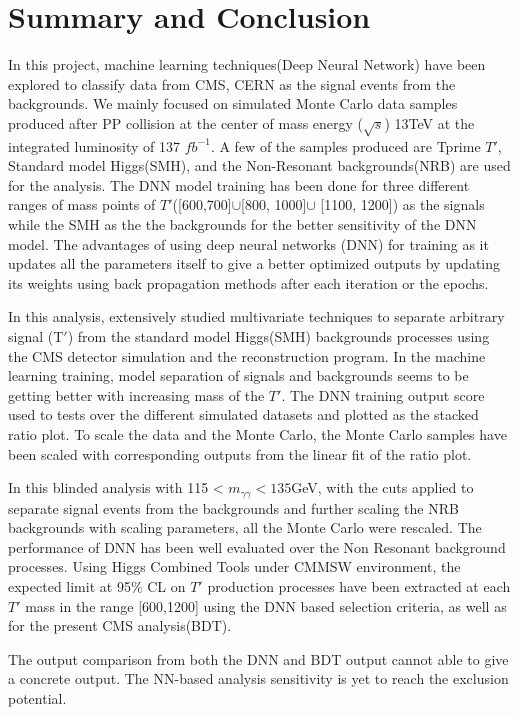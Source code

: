 \chapter{\label{summary}Summary and Conclusion}
In this project, machine learning techniques(Deep Neural Network) have been explored to classify data from CMS, CERN as the signal events from the backgrounds. We mainly focused on simulated Monte Carlo data samples produced after PP collision at the center of mass energy ($\sqrt{s}$) 13TeV at the integrated luminosity of 137 $fb^{-1}$. A few of the samples produced are Tprime $T'$, Standard model Higgs(SMH), and the Non-Resonant backgrounds(NRB) are used for the analysis. The DNN model training has been done for three different ranges of mass points of $T'$([600,700]$\cup$[800, 1000]$\cup$ [1100, 1200]) as the signals while the SMH as the the backgrounds for the better sensitivity of the DNN model. The advantages of using deep neural networks (DNN) for training  as it updates all the parameters itself to give a better optimized outputs by updating its weights using back propagation methods after each iteration or the epochs.

In this analysis, extensively studied multivariate techniques to separate arbitrary signal (T$'$) from the standard model Higgs(SMH) backgrounds processes using the CMS detector simulation and the reconstruction program. In the machine learning training, model separation of signals and backgrounds seems to be getting better with increasing mass of the $T'$.  The DNN training output score used to tests over the different simulated datasets and plotted as the stacked ratio plot. To scale the data and the Monte Carlo, the Monte Carlo samples have been scaled with corresponding outputs from the linear fit of the ratio plot.  

In this blinded analysis with 115 < $m_{\gamma\gamma}< 135$GeV, with the cuts applied to separate signal events from the backgrounds and further scaling the NRB backgrounds with scaling parameters, all the Monte Carlo were rescaled. The performance of DNN has been well evaluated over the Non Resonant background processes. Using Higgs Combined Tools under CMMSW environment, the expected limit at 95\% CL on $T'$ production processes have been extracted at each $T'$ mass in the range
[600,1200] using the DNN based selection criteria, as well as for the present CMS analysis(BDT). 

The output comparison from both the DNN and BDT output cannot able to give a concrete output. The NN-based analysis sensitivity is yet to reach the exclusion potential.

